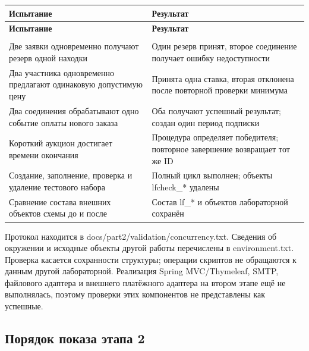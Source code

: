 \begingroup
{}
\fontsize{11}{13}\selectfont
\setlength{\tablecontentwidth}{\dimexpr\linewidth-4\tabcolsep-3\arrayrulewidth\relax}
\begin{longtable}{|>{\RaggedRight\arraybackslash}p{0.30\tablecontentwidth}|>{\RaggedRight\arraybackslash}p{0.70\tablecontentwidth}|}
\hline
\textbf{Испытание} & \textbf{Результат} \\ \hline
\endfirsthead
\textbf{Испытание} & \textbf{Результат} \\ \hline
\endhead
\multicolumn{2}{r}{\footnotesize Продолжение на следующей странице} \\
\endfoot
\endlastfoot
Две заявки одновременно получают резерв одной находки & Один резерв принят, второе соединение получает ошибку недоступности \\ \hline
Два участника одновременно предлагают одинаковую допустимую цену & Принята одна ставка, вторая отклонена после повторной проверки минимума \\ \hline
Два соединения обрабатывают одно событие оплаты нового заказа & Оба получают успешный результат; создан один период подписки \\ \hline
Короткий аукцион достигает времени окончания & Процедура определяет победителя; повторное завершение возвращает тот же ID \\ \hline
Создание, заполнение, проверка и удаление тестового набора & Полный цикл выполнен; объекты lfcheck\_\allowbreak{}* удалены \\ \hline
Сравнение состава внешних объектов схемы до и после & Состав lf\_\allowbreak{}* и объектов лабораторной сохранён \\ \hline
\end{longtable}
\endgroup

Протокол находится в docs/\allowbreak{}part2/\allowbreak{}validation/\allowbreak{}concurrency.txt. Сведения об окружении и исходные объекты другой работы перечислены в environment.txt. Проверка касается сохранности структуры; операции скриптов не обращаются к данным другой лабораторной. Реализация Spring MVC/\allowbreak{}Thymeleaf, SMTP, файлового адаптера и внешнего платёжного адаптера на втором этапе ещё не выполнялась, поэтому проверки этих компонентов не представлены как успешные.

\FloatBarrier
{}
\subsection{Порядок показа этапа 2}

